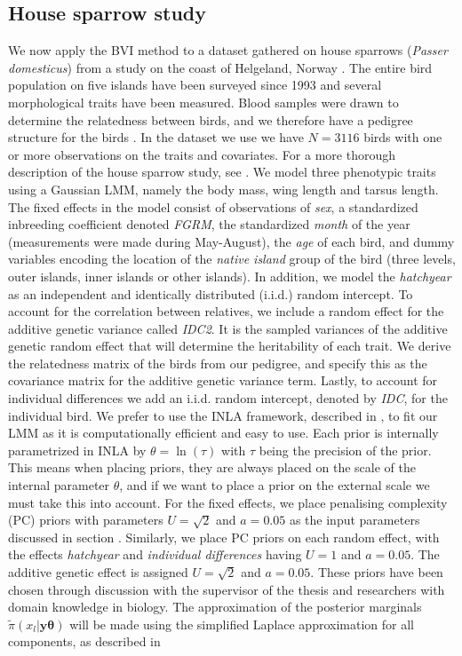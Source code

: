\subsection{House sparrow study}
We now apply the BVI method to a dataset gathered on house sparrows (\textit{Passer domesticus}) from a study on the coast of Helgeland, Norway \citep{Stensland_GMRF_bayes_animal_model}. The entire bird population on five islands have been surveyed since 1993 and several morphological traits have been measured. Blood samples were drawn to determine the relatedness between birds, and we therefore have a pedigree structure for the birds \citep[citing Jensen et al., 2003, 2004, 2008]{Stensland_GMRF_bayes_animal_model}. In the dataset we use we have $N=3116$ birds with one or more observations on the traits and covariates. For a more thorough description of the house sparrow study, see \citet[and references therein]{Stensland_GMRF_bayes_animal_model}. We model three phenotypic traits using a Gaussian LMM, namely the body mass, wing length and tarsus length. The fixed effects in the model consist of observations of \textit{sex}, a standardized inbreeding coefficient denoted \textit{FGRM}, the standardized \textit{month} of the year (measurements were made during May-August), the \textit{age} of each bird, and dummy variables encoding the location of the \textit{native island} group of the bird (three levels, outer islands, inner islands or other islands). In addition, we model the \textit{hatchyear}  as an independent and identically distributed (i.i.d.) random intercept. To account for the correlation between relatives, we include a random effect for the additive genetic variance called \textit{IDC2}. It is the sampled variances of the additive genetic random effect that will determine the heritability of each trait. We derive the relatedness matrix of the birds from our pedigree, and specify this as the covariance matrix for the additive genetic variance term. Lastly, to account for individual differences we add an i.i.d. random intercept, denoted by \textit{IDC}, for the individual bird. We prefer to use the INLA framework, described in , to fit our LMM as it is computationally efficient and easy to use. Each prior is internally parametrized in INLA by $\theta=\ln(\tau)$ with $\tau$ being the precision of the prior. This means when placing priors, they are always placed on the scale of the internal parameter $\theta$, and if we want to place a prior on the external scale we must take this into account. For the fixed effects, we place penalising complexity (PC) priors with parameters $U=\sqrt{2}$ and $a=0.05$ as the input parameters discussed in section . Similarly, we place PC priors on each random effect, with the effects \textit{hatchyear} and \textit{individual differences} having $U=1$ and $a=0.05$.  The additive genetic effect is assigned $U=\sqrt{2}$ and $a=0.05$. These priors have been chosen through discussion with the supervisor of the thesis and researchers with domain knowledge in biology. The approximation of the posterior marginals $\tilde{\pi}(x_l \lvert \mathbf{y} \boldsymbol{\theta})$ will be made using the simplified Laplace approximation for all components, as described in 